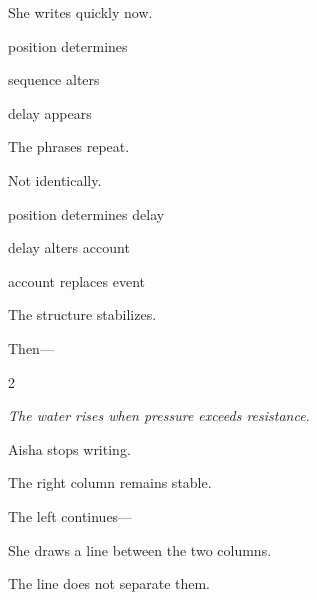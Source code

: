 She writes quickly now.

\medskip

 position determines

 sequence alters

 delay appears

\medskip

The phrases repeat.

Not identically.

\medskip

 position determines  delay

 delay alters  account

 account replaces  event

\medskip

The structure stabilizes.

\medskip

Then---

\medskip

\begin{multicols}{2}


\columnbreak

\textit{The water rises when pressure exceeds resistance.}

\end{multicols}

\medskip

Aisha stops writing.

\medskip

The right column remains stable.

\medskip

The left continues---

\medskip


\medskip

She draws a line between the two columns.

\medskip

The line does not separate them.

\medskip

